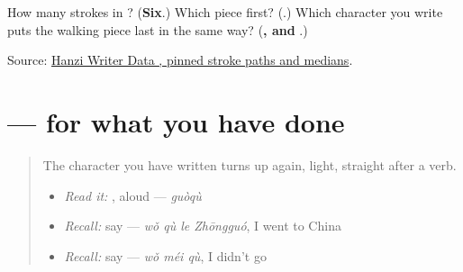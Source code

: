 \begin{tcolorbox}[breakable,colback=teal!4,colframe=teal!35!black,title={Before you move on}]
How many strokes in ? (\textbf{Six}.) Which piece first? (\textbf{}.) Which character you write puts the walking piece last in the same way? (\textbf{, and }.)

Source: \href{https://raw.githubusercontent.com/chanind/hanzi-writer-data/68d10a4b21150cae5e1ebbd223eed289cf32d90c/data/\%E8\%BF\%87.json}{Hanzi Writer Data , pinned stroke paths and medians}.
\end{tcolorbox}
\section[\texorpdfstring{\zh{你去过中国吗} (nǐ qù guo Zhōngguó ma)}{你去过中国吗 (nǐ qù guo Zhōngguó ma)}]{ —  for what you have done}

\label{lesson:ZH-C150-guo-ever}



\begin{quote}
The character you have written turns up again, light, straight after a verb.

\begin{itemize}
\raggedright
  \item \emph{Read it:} , aloud — \emph{guòqù}
  \item \emph{Recall:} say  — \emph{wǒ qù le Zhōngguó}, I went to China
  \item \emph{Recall:} say  — \emph{wǒ méi qù}, I didn't go
\end{itemize}
\end{quote}

